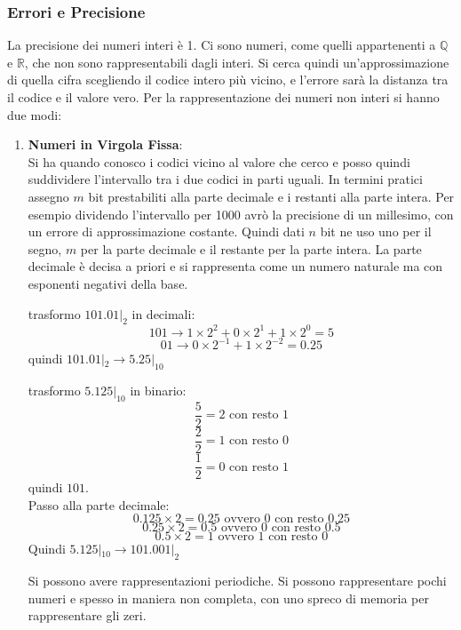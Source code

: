 \documentclass[a4paper,12pt, oneside]{book}
\begin{document}
\subsubsection{Errori e Precisione}
La precisione dei numeri interi è 1. Ci sono numeri, come quelli appartenenti a $\mathbb{Q}$ e $\mathbb{R}$, che non sono rappresentabili dagli interi. Si cerca quindi un'approssimazione di quella cifra scegliendo il codice intero più vicino, e l'errore sarà la distanza tra il codice e il valore vero.
Per la rappresentazione dei numeri non interi si hanno due modi:
\begin{enumerate}
	\item \textbf{Numeri in Virgola Fissa}:\\
	      Si ha quando conosco i codici vicino al valore che cerco e posso quindi suddividere l'intervallo tra i due codici in parti uguali. In termini pratici assegno $m$ bit prestabiliti alla parte decimale e i restanti alla parte intera. Per esempio dividendo l'intervallo per 1000 avrò la precisione di un millesimo, con un errore di approssimazione costante. Quindi dati $n$ bit ne uso uno per il segno, $m$ per la parte decimale e il restante per la parte intera. La parte decimale è decisa a priori e si rappresenta come un numero naturale ma con esponenti negativi della base.
	      \begin{esempio}
		      trasformo $101.01|_{2}$ in decimali:\\
		      $$101 \rightarrow 1\times 2^2+ 0\times 2^1+1 \times 2^0=5$$
		      $$01\rightarrow 0\times 2^{-1}+1\times 2^{-2}=0.25$$
		      quindi $101.01|_{2}\rightarrow 5.25|_{10}$
	      \end{esempio}
	      \begin{esempio}
		      trasformo $5.125|_{10}$ in binario:\\
		      $$\frac{5}{2}=2 \mbox{ con resto } 1$$
		      $$\frac{2}{2}=1 \mbox{ con resto } 0$$
		      $$\frac{1}{2}=0 \mbox{ con resto } 1$$
		      quindi $101$.\\
		      Passo alla parte decimale:\\
		      $$0.125\times 2 = 0.25 \mbox{ ovvero } 0 \mbox{ con resto } 0.25$$
		      $$0.25\times 2 = 0.5 \mbox{ ovvero } 0 \mbox{ con resto } 0.5$$
		      $$0.5\times 2 = 1 \mbox{ ovvero } 1 \mbox{ con resto } 0$$
		      Quindi $5.125|_{10}\rightarrow 101.001|_{2}$
	      \end{esempio}
	      Si possono avere rappresentazioni periodiche. Si possono rappresentare pochi numeri e spesso in maniera non completa, con uno spreco di memoria per rappresentare gli zeri.

\end{enumerate}
\end{document}
